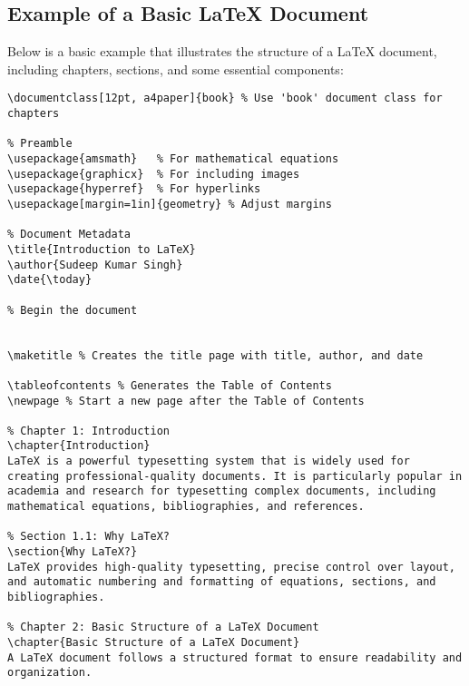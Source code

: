 \subsection{Example of a Basic LaTeX Document}
Below is a basic example that illustrates the structure of a LaTeX document, including chapters, sections, and some essential components:

\begin{verbatim}
\documentclass[12pt, a4paper]{book} % Use 'book' document class for chapters

% Preamble
\usepackage{amsmath}   % For mathematical equations
\usepackage{graphicx}  % For including images
\usepackage{hyperref}  % For hyperlinks
\usepackage[margin=1in]{geometry} % Adjust margins

% Document Metadata
\title{Introduction to LaTeX}
\author{Sudeep Kumar Singh}
\date{\today}

% Begin the document


\maketitle % Creates the title page with title, author, and date

\tableofcontents % Generates the Table of Contents
\newpage % Start a new page after the Table of Contents

% Chapter 1: Introduction
\chapter{Introduction}
LaTeX is a powerful typesetting system that is widely used for creating professional-quality documents. It is particularly popular in academia and research for typesetting complex documents, including mathematical equations, bibliographies, and references.

% Section 1.1: Why LaTeX?
\section{Why LaTeX?}
LaTeX provides high-quality typesetting, precise control over layout, and automatic numbering and formatting of equations, sections, and bibliographies.

% Chapter 2: Basic Structure of a LaTeX Document
\chapter{Basic Structure of a LaTeX Document}
A LaTeX document follows a structured format to ensure readability and organization.

\end{verbatim}
